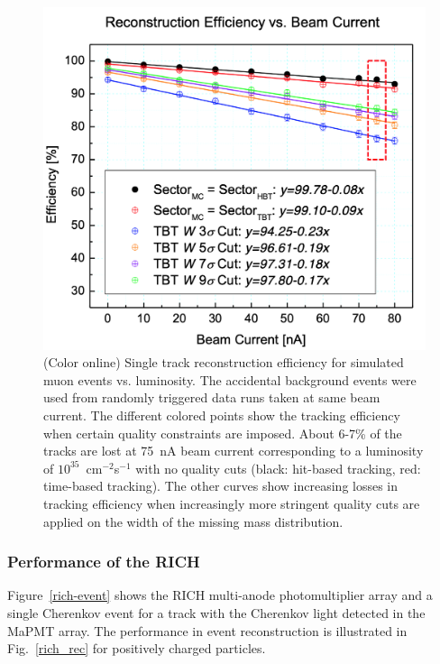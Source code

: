 \documentclass[final,3p,twocolumn]{elsarticle}
\begin{document}
\begin{figure}[t!]
\centerline{\includegraphics[width=1.0\columnwidth]{efficiencies.png}}
\caption{(Color online) Single track reconstruction efficiency for simulated muon events vs. luminosity. 
The accidental background events were used from randomly triggered data runs taken at same beam current. 
The different colored points show the
tracking efficiency when certain quality constraints are imposed. About 6-7\% of the tracks are lost at 75~nA
beam current corresponding to a luminosity of $10^{35}$~cm$^{-2}$s$^{-1}$ with no quality cuts (black: hit-based
tracking, red: time-based tracking). The other curves show increasing losses in tracking efficiency when increasingly
more stringent quality cuts are applied on the width of the missing mass distribution.}
\label{efficiencies}
\end{figure}

\subsubsection{Performance of the RICH} 

Figure~\ref{rich-event} shows the RICH multi-anode photomultiplier array and a single Cherenkov event for a
track with the Cherenkov light detected in the MaPMT array.  The performance in event reconstruction is
illustrated in Fig.~\ref{rich_rec} for positively charged particles. 
\end{document}
